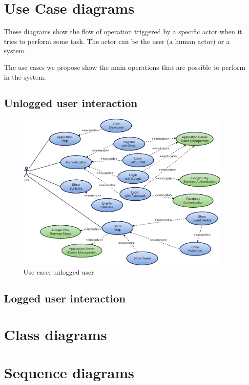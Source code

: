 \documentclass[a4paper]{scrreprt}
\begin{document}
\section{Use Case diagrams}
These diagrams show the flow of operation triggered by a specific actor when it tries to perform some task. The actor can be the user (a human actor) or a system.
\par The use cases we propose show the main operations that are possible to perform in the system.
\subsection{Unlogged user interaction}
\begin{figure}[H]
	\centering
	\includegraphics[width=0.95\textwidth]{diagrams/use_case/unlogged_user.png}
	\caption{Use case: unlogged user}
\end{figure}

\subsection{Logged user interaction}
\section{Class diagrams}

\section{Sequence diagrams}

\end{document}
